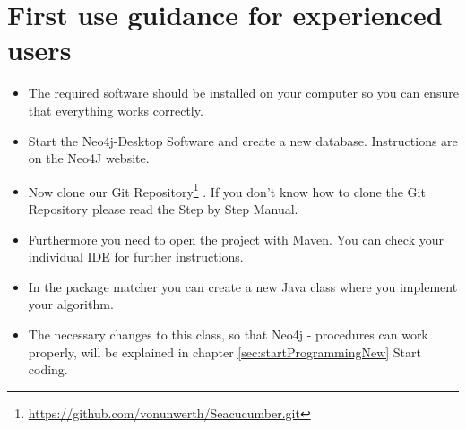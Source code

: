 \section {First use guidance for experienced users} \label{sec:beforeFirstUseNew}
\begin{itemize}
	\item The required software should be installed on your computer so you can ensure that everything works correctly.
	\item Start the Neo4j-Desktop Software and create a new database. Instructions are on the Neo4J website.
	\item Now clone our \glqq Git Repository\footnote{\url{https://github.com/vonunwerth/Seacucumber.git}} \grqq{}. If you don't know how to clone the \glqq Git Repository\grqq{} please read the Step by Step Manual.
	\item Furthermore you need to open the project with Maven. You can check your individual IDE for further instructions.
	\item In the package \glqq matcher\grqq{} you can create a new Java class where you implement your algorithm.
	\item The necessary changes to this class, so that \glqq Neo4j - procedures\grqq{} can work properly, will be explained in chapter \ref{sec:startProgrammingNew} \glqq Start coding\grqq{}.
\end{itemize}

